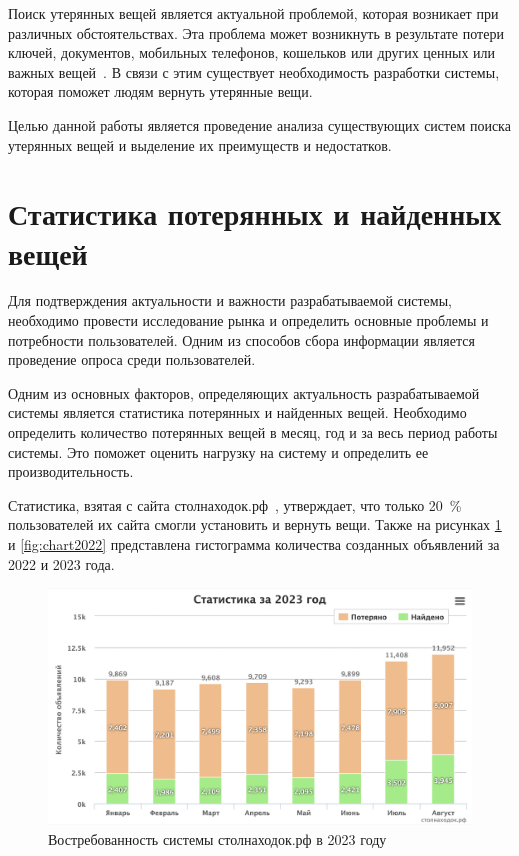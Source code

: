 \documentclass{../mirea}
\begin{document}
	
	
	\addtocounter{page}{2}
	
	\tableofcontents
	
	\label{sec:introduction}
	
	Поиск утерянных вещей является актуальной проблемой, которая возникает при различных обстоятельствах. Эта проблема может возникнуть в результате потери ключей, документов, мобильных телефонов, кошельков или других ценных или важных вещей~\cite{bib:m24_losts_article,bib:usinsk_losts_article}. В связи с этим существует необходимость разработки системы, которая поможет людям вернуть утерянные вещи.
	
	Целью данной работы является проведение анализа существующих систем поиска утерянных вещей и выделение их преимуществ и недостатков.
	
	\section{Статистика потерянных и найденных вещей}
	
	Для подтверждения актуальности и важности разрабатываемой системы, необходимо провести исследование рынка и определить основные проблемы и потребности пользователей. Одним из способов сбора информации является проведение опроса среди пользователей.
	
	Одним из основных факторов, определяющих актуальность разрабатываемой системы является статистика потерянных и найденных вещей. Необходимо определить количество потерянных вещей в месяц, год и за весь период работы системы. Это поможет оценить нагрузку на систему и определить ее производительность.
	
	Статистика, взятая с сайта столнаходок.рф~\cite{bib:stol_nahodok}, утверждает, что только 20~\% пользователей их сайта смогли установить и вернуть вещи. Также на рисунках \ref{fig:chart2023} и \ref{fig:chart2022} представлена гистограмма количества созданных объявлений за 2022 и 2023 года.
	
	\begin{figure}[htb]
		\centering
		\includegraphics[width=.6\textwidth]{../images/chart2023}
		\parskip=6pt
		\caption{Востребованность системы столнаходок.рф в 2023 году}
		\label{fig:chart2023}
	\end{figure}
	
\end{document}
